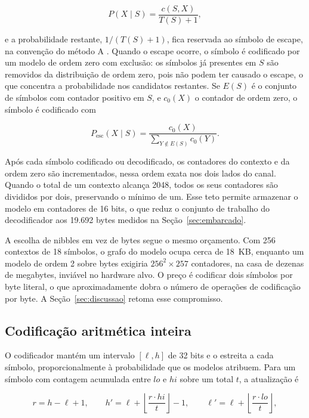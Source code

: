 \documentclass[12pt]{article}
\begin{document}
\begin{equation}
P(X \mid S) = \frac{c(S,X)}{T(S) + 1},
\end{equation}

e a probabilidade restante, $1/(T(S)+1)$, fica reservada ao símbolo de escape,
na convenção do método A \cite{cleary:84}. Quando o escape ocorre, o
símbolo é codificado por um modelo de ordem zero com exclusão: os símbolos já
presentes em $S$ são removidos da distribuição de ordem zero, pois não podem ter
causado o escape, o que concentra a probabilidade nos candidatos restantes. Se
$E(S)$ é o conjunto de símbolos com contador positivo em $S$, e $c_0(X)$ o
contador de ordem zero, o símbolo é codificado com

\begin{equation}
P_{\text{esc}}(X \mid S) = \frac{c_0(X)}{\sum_{Y \notin E(S)} c_0(Y)}.
\end{equation}

Após cada símbolo codificado ou decodificado, os contadores do contexto e da
ordem zero são incrementados, nessa ordem exata nos dois lados do canal. Quando
o total de um contexto alcança 2048, todos os seus contadores são divididos por
dois, preservando o mínimo de um. Esse teto permite armazenar o modelo em
contadores de 16 bits, o que reduz o conjunto de trabalho do decodificador aos
19.692 bytes medidos na Seção~\ref{sec:embarcado}.

A escolha de nibbles em vez de bytes segue o mesmo orçamento. Com 256 contextos
de 18 símbolos, o grafo do modelo ocupa cerca de 18~KB, enquanto um modelo de
ordem 2 sobre bytes exigiria $256^2 \times 257$ contadores, na casa de dezenas
de megabytes, inviável no hardware alvo. O preço é codificar dois símbolos por
byte literal, o que aproximadamente dobra o número de operações de codificação
por byte. A Seção~\ref{sec:discussao} retoma esse compromisso.

\subsection{Codificação aritmética inteira}

O codificador mantém um intervalo $[\ell, h]$ de 32 bits e o estreita a cada
símbolo, proporcionalmente à probabilidade que os modelos atribuem. Para um
símbolo com contagem acumulada entre $lo$ e $hi$ sobre um total $t$, a
atualização é

\begin{equation}
r = h - \ell + 1, \qquad
h' = \ell + \left\lfloor \frac{r \cdot hi}{t} \right\rfloor - 1, \qquad
\ell' = \ell + \left\lfloor \frac{r \cdot lo}{t} \right\rfloor ,
\end{equation}
\end{document}

